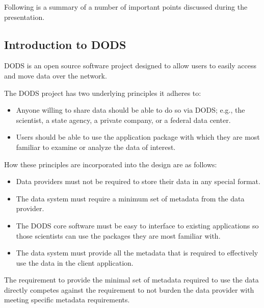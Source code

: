 Following is a summary of a number of important points discussed during the presentation.

\subsection{Introduction to DODS}

DODS is an open source software project designed to allow users to easily access and move 
data over the network.

The DODS project has two underlying principles it adheres to:

\begin{itemize}
\item Anyone willing to share data should be able to do so via DODS; e.g., the scientist, a state 
agency, a private company, or a federal data center.
\item Users should be able to use the application package with which they are most familiar to 
examine or analyze the data of interest.
\end{itemize}

How these principles are incorporated into the design are as follows:

\begin{itemize}
\item Data providers must not be required to store their data in any special format.
\item The data system must require a minimum set of metadata from the data provider.
\item The DODS core software must be easy to interface to existing applications so those scientists 
can use the packages they are most familiar with.
\item The data system must provide all the metadata that is required to effectively use the data in 
the client application.
\end{itemize}

The requirement to provide the minimal set of metadata required to use the data directly 
competes against the requirement to not burden the data provider with meeting specific metadata 
requirements.

